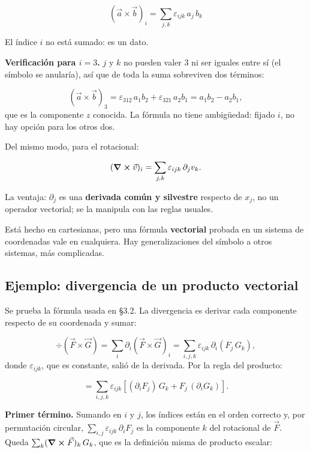\documentclass[12pt,a4paper]{article}
\begin{document}
\begin{keybox}
\[
\boxed{\ (\vec a\times\vec b)_i = \sum_{j,k}\varepsilon_{ijk}\,a_j\,b_k\ }
\]
\end{keybox}

El índice $i$ no está sumado: es un dato.

\textbf{Verificación para $i=3$.} $j$ y $k$ no pueden valer 3 ni ser iguales entre
sí (el símbolo se anularía), así que de toda la suma sobreviven dos términos:

\[
(\vec a\times\vec b)_3 = \varepsilon_{312}\,a_1 b_2 + \varepsilon_{321}\,a_2 b_1
= a_1 b_2 - a_2 b_1,
\]
que es la componente $z$ conocida. La fórmula no tiene ambigüedad: fijado $i$,
no hay opción para los otros dos.

Del mismo modo, para el rotacional:

\[
(\curl \vec v)_i = \sum_{j,k}\varepsilon_{ijk}\,\partial_j v_k .
\]

La ventaja: $\partial_j$ es una \textbf{derivada común y silvestre} respecto de
$x_j$, no un operador vectorial; se la manipula con las reglas usuales.

\begin{notebox}
Está hecho en cartesianas, pero una fórmula \textbf{vectorial} probada en un
sistema de coordenadas vale en cualquiera. Hay generalizaciones del símbolo a
otros sistemas, más complicadas.
\end{notebox}

\subsection{Ejemplo: divergencia de un producto vectorial}

Se prueba la fórmula usada en §3.2. La divergencia es derivar cada componente
respecto de su coordenada y sumar:

\[
\div (\vec F\times\vec G) = \sum_i \partial_i(\vec F\times\vec G)_i
= \sum_{i,j,k}\varepsilon_{ijk}\,\partial_i\!\left(F_j\,G_k\right),
\]
donde $\varepsilon_{ijk}$, que es constante, salió de la derivada. Por la regla
del producto:

\[
= \sum_{i,j,k}\varepsilon_{ijk}\left[(\partial_i F_j)\,G_k + F_j\,(\partial_i G_k)\right].
\]

\textbf{Primer término.} Sumando en $i$ y $j$, los índices están en el orden
correcto y, por permutación circular,
$\sum_{i,j}\varepsilon_{ijk}\,\partial_i F_j$ es la componente $k$ del
rotacional de $\vec F$. Queda $\sum_k (\curl \vec F)_k\,G_k$, que es la
definición misma de producto escalar:
\end{document}
